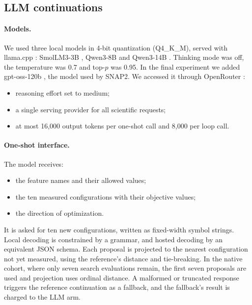 \subsection{LLM continuations}

\paragraph{Models.} We used three local models in 4-bit quantization (Q4\_K\_M), served with llama.cpp \cite{gerganov2023llamacpp}: SmolLM3-3B \cite{huggingface2025smollm3}, Qwen3-8B and Qwen3-14B \cite{qwen2025qwen3}. Thinking mode was off, the temperature was 0.7 and top-$p$ was 0.95. In the final experiment we added gpt-oss-120b \cite{openai2025gptoss}, the model used by SNAP2. We accessed it through OpenRouter \cite{openrouter2025}:
\begin{itemize}
  \item reasoning effort set to medium;
  \item a single serving provider for all scientific requests;
  \item at most 16,000 output tokens per one-shot call and 8,000 per loop call.
\end{itemize}

\paragraph{One-shot interface.} The model receives:
\begin{itemize}
  \item the feature names and their allowed values;
  \item the ten measured configurations with their objective values;
  \item the direction of optimization.
\end{itemize}
It is asked for ten new configurations, written as fixed-width symbol strings. Local decoding is constrained by a grammar, and hosted decoding by an equivalent JSON schema. Each proposal is projected to the nearest configuration not yet measured, using the reference's distance and tie-breaking. In the native cohort, where only seven search evaluations remain, the first seven proposals are used and projection uses ordinal distance. A malformed or truncated response triggers the reference continuation as a fallback, and the fallback's result is charged to the LLM arm.

